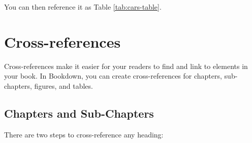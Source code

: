 \documentclass[
]{book}
\theoremstyle{definition}
\theoremstyle{definition}
\theoremstyle{definition}
\theoremstyle{definition}
\theoremstyle{remark}
\begin{document}
You can then reference it as Table \ref{tab:cars-table}.

\chapter{Cross-references}\label{cross}

Cross-references make it easier for your readers to find and link to elements in your book. In Bookdown, you can create cross-references for chapters, sub-chapters, figures, and tables.

\section{Chapters and Sub-Chapters}\label{chapters-and-sub-chapters}

There are two steps to cross-reference any heading:
\end{document}
